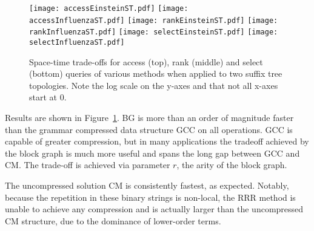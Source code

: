 \documentclass[12pt]{article}
\begin{document}
\begin{figure}[htb]
  \texttt{[image: accessEinsteinST.pdf]}
\endminipage\hfill
{}
  \texttt{[image: accessInfluenzaST.pdf]}
\endminipage
\vspace{1ex}
\newline
{}
  \texttt{[image: rankEinsteinST.pdf]}
\endminipage\hfill
{}
  \texttt{[image: rankInfluenzaST.pdf]}
\endminipage
\vspace{1ex}
\newline
{}
  \texttt{[image: selectEinsteinST.pdf]}
\endminipage\hfill
{}
  \texttt{[image: selectInfluenzaST.pdf]}
\endminipage

\caption{Space-time trade-offs for access (top), rank (middle) and select (bottom) queries
of various methods when applied to two suffix tree topologies.
Note the log scale on the y-axes and that not all x-axes start at 0.
}
\label{figure:bitvectors}
\end{figure}

Results are shown in Figure~\ref{figure:bitvectors}. 
BG is more than an order of magnitude faster than the grammar compressed data structure GCC
on all operations. GCC is capable of greater compression, but in many applications the 
tradeoff achieved by the block graph is much more useful and spans the long gap between
GCC and CM. The trade-off is achieved via parameter $r$, the arity of the block graph. 

The uncompressed solution CM is consistently fastest, 
as expected. Notably, because the repetition in these binary strings is non-local, the 
RRR method is unable to achieve any compression and is actually larger than the 
uncompressed CM structure, due to the dominance of lower-order terms.
\end{document}
